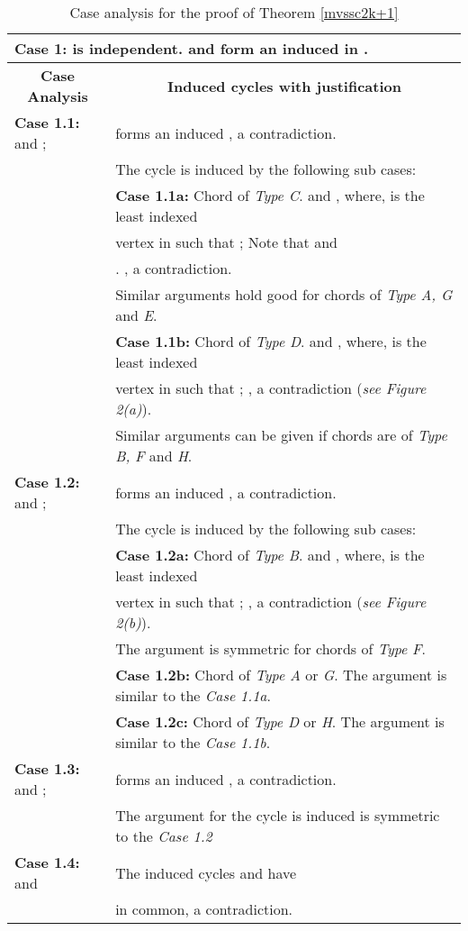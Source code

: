 \documentclass[runningheads]{llncs}
\begin{document}
\begin{table}[H]
\caption{Case analysis for the proof of Theorem \ref{mvssc2k+1}}
\label{table:table1}
\begin{tabular}{|l|l|}
\multicolumn{2}{l}{\textbf{Case 1:}   is independent.  and  form an induced  in .}\\ \hline

\multicolumn{1}{|c|}{\textbf{Case Analysis}} & \multicolumn{1}{|c|}{\textbf{Induced cycles with justification}}\\  \hline 
\textbf{Case 1.1:}  and ; &   forms an induced , a contradiction. \\ 
& 	The cycle is induced by the following sub cases:\\ \cline{2-2} 
&\textbf{Case 1.1a:} Chord of \emph{Type C}.  and , where,  is the least indexed \\
& vertex in  such that ; Note that  and \\
& . , a contradiction. \\ 
&	Similar arguments hold good for chords of \emph{Type A, G} and \emph{E}. \\ \cline{2-2}
&\textbf{Case 1.1b:} Chord of \emph{Type D}.  and , where,  is the least indexed \\
&  vertex in  such that ; , a contradiction (\emph{see Figure 2(a)}). \\ 
&	Similar arguments can be given if chords are of \emph{Type B, F} and \emph{H}.\\
\hline
\textbf{Case 1.2:}  and ; &  forms an induced , a contradiction. \\ 
& The cycle is induced by the following sub cases:\\ \cline{2-2}

&	\textbf{Case 1.2a:} Chord of \emph{Type B}.  and , where,  is the least indexed \\
&	vertex in  such that ; , a contradiction (\emph{see Figure 2(b)}).  \\ 
&	The argument is symmetric for chords of \emph{Type F}.\\ \cline{2-2}
& \textbf{Case 1.2b:} Chord of \emph{Type A} or \emph{G}.  The argument is similar to the \emph{Case 1.1a}. \\ \cline{2-2}
& \textbf{Case 1.2c:} Chord of \emph{Type D} or \emph{H}. The argument is similar to the \emph{Case 1.1b}. \\  \hline

\textbf{Case 1.3:}  and ; &  forms an induced , a contradiction. \\
& The argument for the cycle is induced is symmetric to the \emph{Case 1.2}\\ \hline

\textbf{Case 1.4:}  and  & The induced cycles  and  have  \\
& in common, a contradiction.\\ \hline
\end{tabular}
\vspace{-0.8cm}
\end{table}
\end{document}
